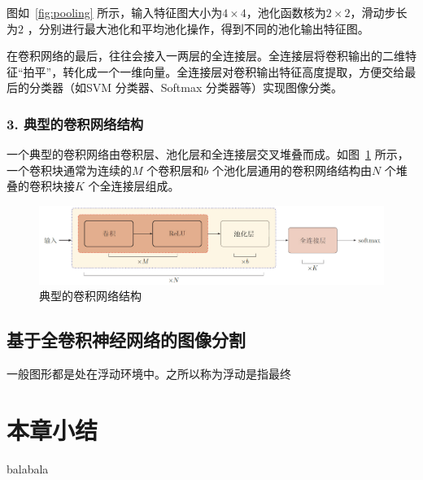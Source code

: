 图如~\ref{fig:pooling} 所示，输入特征图大小为$4 \times 4$，池化函数核为$2 \times 2$，滑动步长为$2$ ，分别进行最大池化和平均池化操作，得到不同的池化输出特征图。

在卷积网络的最后，往往会接入一两层的全连接层。全连接层将卷积输出的二维特征“拍平”，转化成一个一维向量。全连接层对卷积输出特征高度提取，方便交给最后的分类器（如SVM 分类器、Softmax 分类器等）实现图像分类。

\subsubsection*{3. 典型的卷积网络结构}
\label{subsec:chap02-2-1-3}
一个典型的卷积网络由卷积层、池化层和全连接层交叉堆叠而成。如图~\ref{fig:cnn_structure} 所示，一个卷积块通常为连续的$M$ 个卷积层和$b$ 个池化层通用的卷积网络结构由$N$ 个堆叠的卷积块接$K$ 个全连接层组成。

\begin{figure}[htbp]
  \centering
  \includegraphics[width=1.0\textwidth]{figures/cnn_structure}
  \caption{典型的卷积网络结构}\label{fig:cnn_structure}
\end{figure}

\subsection{基于全卷积神经网络的图像分割}
\label{subsec:chap02-2-1}
一般图形都是处在浮动环境中。之所以称为浮动是指最终


\section{本章小结}
\label{sec:chap02-3}
balabala